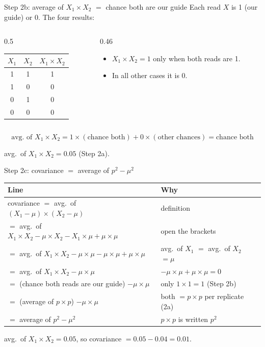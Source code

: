 \documentclass[aspectratio=169,11pt]{beamer}
\begin{document}
\begin{frame}{Step 2b: average of $X_1 \times X_2$ $=$ chance both are our guide}
Each read $X$ is 1 (our guide) or 0. The four results:
\medskip

\begin{columns}[T]
\begin{column}{0.5\textwidth}
\small
\begin{tabular}{@{}ccc@{}}
\toprule
$X_1$ & $X_2$ & $X_1 \times X_2$\\
\midrule
1 & 1 & \alert{1}\\
1 & 0 & 0\\
0 & 1 & 0\\
0 & 0 & 0\\
\bottomrule
\end{tabular}
\end{column}
\begin{column}{0.46\textwidth}
\begin{itemize}\small
\item $X_1 \times X_2 = 1$ only when \alert{both} reads are 1.
\item In all other cases it is 0.
\end{itemize}
\end{column}
\end{columns}
\[
\text{avg.\ of } X_1 \times X_2
 = 1 \times (\text{chance both}) + 0 \times (\text{other chances})
 = \text{chance both}
\]
\begin{worked}[ case B]
avg.\ of $X_1 \times X_2 = 0.05$ (Step 2a).
\end{worked}
\end{frame}

\begin{frame}{Step 2c: covariance $=$ average of $p^2 - \mu^2$}
\small
\renewcommand{\arraystretch}{1.1}\setlength{\tabcolsep}{3pt}
\begin{tabular}{@{}l l@{}}
\toprule
\textbf{Line} & \textbf{Why}\\
\midrule
covariance $=$ avg.\ of $(X_1 - \mu) \times (X_2 - \mu)$ & definition\\
$=$ avg.\ of $X_1 \times X_2 - \mu \times X_2 - X_1 \times \mu + \mu \times \mu$ & open the brackets\\
$=$ avg.\ of $X_1 \times X_2 - \mu \times \mu - \mu \times \mu + \mu \times \mu$ & avg.\ of $X_1$ $=$ avg.\ of $X_2$ $= \mu$\\
$=$ avg.\ of $X_1 \times X_2 - \mu \times \mu$ & $-\mu \times \mu + \mu \times \mu = 0$\\
$=$ (chance both reads are our guide) $- \mu \times \mu$ & only $1 \times 1 = 1$ (Step 2b)\\
$=$ (average of $p \times p$) $- \mu \times \mu$ & both $= p \times p$ per replicate (2a)\\
$=$ average of $p^2 - \mu^2$ & $p \times p$ is written $p^2$\\
\bottomrule
\end{tabular}
\begin{worked}[ case B]
avg.\ of $X_1 \times X_2 = 0.05$, so covariance $= 0.05 - 0.04 = 0.01$.
\end{worked}
\end{frame}
\end{document}
